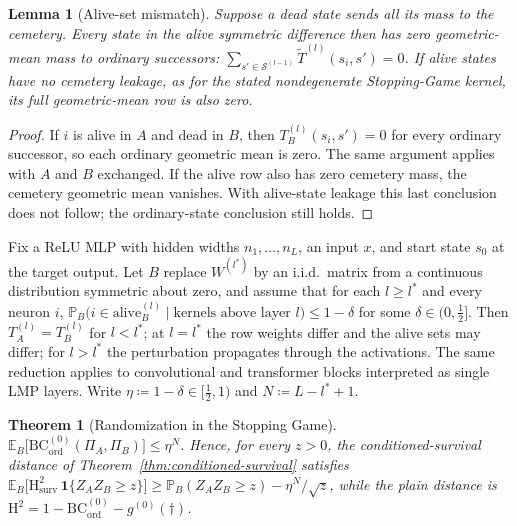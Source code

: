 \documentclass[twoside]{article}
\newcommand{\1}{\mathbf{1}}
\newtheorem{theorem}{Theorem}
\newtheorem{lemma}{Lemma}
\begin{document}
\begin{lemma}[Alive-set mismatch]\label{lem:alive-mismatch}
Suppose a dead state sends all its mass to the cemetery. Every state in the
alive symmetric difference then has zero geometric-mean mass to ordinary
successors:
$\sum_{s'\in\mathcal S^{(l-1)}}\widetilde T^{(l)}(s_i,s')=0$.
If alive states have no cemetery leakage, as for the stated nondegenerate
Stopping-Game kernel, its full geometric-mean row is also zero.
\end{lemma}

\begin{proof}
If $i$ is alive in $A$ and dead in $B$, then $T_B^{(l)}(s_i,s')=0$ for every
ordinary successor, so each ordinary geometric mean is zero. The same argument
applies with $A$ and $B$ exchanged. If the alive row also has zero cemetery mass,
the cemetery geometric mean vanishes. With alive-state leakage this last
conclusion does not follow; the ordinary-state conclusion still holds.
\end{proof}

Fix a ReLU MLP with hidden widths $n_1,\ldots,n_L$, an input $x$, and start state $s_0$ at the
target output.  Let $B$ replace $W^{(l^*)}$ by an i.i.d.\ matrix from a continuous distribution
symmetric about zero, and assume that for each $l \ge l^*$ and every neuron $i$,
$\mathbb{P}_B\bigl(i \in \mathrm{alive}^{(l)}_B \mid \text{kernels above layer } l\bigr) \le
    1-\delta$ for some $\delta \in (0,\tfrac12]$.  Then $T_A^{(l)} = T_B^{(l)}$ for $l < l^*$; at $l =
    l^*$ the row weights differ and the alive sets may differ; for $l > l^*$ the perturbation
propagates through the activations.  The same reduction applies to convolutional and transformer
blocks interpreted as single \ac{LMP} layers.  Write $\eta \coloneqq 1 - \delta \in
    \bigl[\tfrac{1}{2}, 1\bigr)$ and $N \coloneqq L - l^* + 1$.

\begin{theorem}[Randomization in the Stopping Game]\label{thm:rand-adf}
$\mathbb{E}_B\bigl[\mathrm{BC}^{(0)}_{\mathrm{ord}}(\Pi_A, \Pi_B)\bigr] \leq \eta^{N}$.  Hence, for
every $z > 0$, the conditioned-survival distance of Theorem~\ref{thm:conditioned-survival}
satisfies $\mathbb{E}_B\bigl[\mathrm{H}^2_{\mathrm{surv}}\,\1\{Z_A Z_B \geq z\}\bigr] \geq
    \mathbb{P}_B(Z_A Z_B \geq z) - \eta^{N}/\sqrt{z}$, while the plain distance is $\mathrm{H}^2 = 1 -
    \mathrm{BC}^{(0)}_{\mathrm{ord}} - g^{(0)}(\dagger)$.
\end{theorem}
\end{document}
